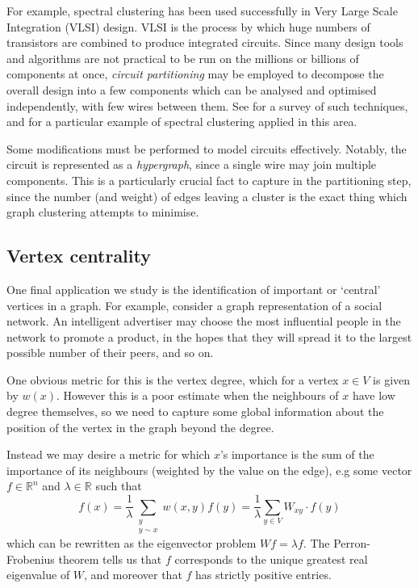 \documentclass[a4paper,11pt]{article}
\theoremstyle{definition}
\newcommand{\R}{\mathbb{R}}
\begin{document}
For example, spectral clustering has been used successfully in Very Large Scale Integration (VLSI) design. VLSI is the process by which huge numbers of transistors are combined to produce integrated circuits. Since many design tools and algorithms are not practical to be run on the millions or billions of components at once, \emph{circuit partitioning} may be employed to decompose the overall design into a few components which can be analysed and optimised independently, with few wires between them. See \cite{vlsi} for a survey of such techniques, and \cite{vlsi-spectral} for a particular example of spectral clustering applied in this area.

Some modifications must be performed to model circuits effectively. Notably, the circuit is represented as a \emph{hypergraph}, since a single wire may join multiple components. This is a particularly crucial fact to capture in the partitioning step, since the number (and weight) of edges leaving a cluster is the exact thing which graph clustering attempts to minimise.

\subsection{Vertex centrality}

One final application we study is the identification of important or `central' vertices in a graph. For example, consider a graph representation of a social network. An intelligent advertiser may choose the most influential people in the network to promote a product, in the hopes that they will spread it to the largest possible number of their peers, and so on.

\medskip

One obvious metric for this is the vertex degree, which for a vertex $x \in V$ is given by $w(x)$. However this is a poor estimate when the neighbours of $x$ have low degree themselves, so we need to capture some global information about the position of the vertex in the graph beyond the degree.

Instead we may desire a metric for which $x$'s importance is the sum of the importance of its neighbours (weighted by the value on the edge), e.g some vector $f \in \R^n$ and $\lambda \in \R$ such that
\begin{equation}\label{eigenvector-centrality-eqn}
f(x) = \frac{1}{\lambda} \sum_{\substack{y \\ y \sim x}} w(x, y) f(y) = \frac{1}{\lambda} \sum_{y \in V} W_{xy} \cdot f(y)
\end{equation}
which can be rewritten as the eigenvector problem $Wf = \lambda f$. The Perron-Frobenius theorem tells us that $f$ corresponds to the unique greatest real eigenvalue of $W$, and moreover that $f$ has strictly positive entries.
\end{document}
